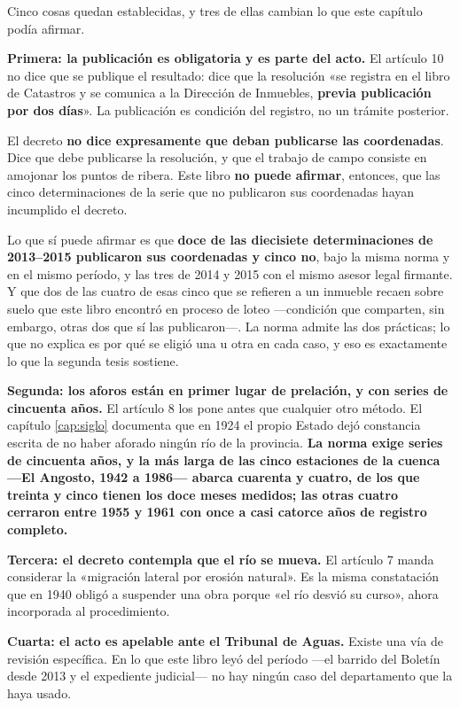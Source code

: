 Cinco cosas quedan establecidas, y tres de ellas cambian lo que este capítulo podía afirmar.

\textbf{Primera: la publicación es obligatoria y es parte del acto.} El artículo 10 no dice
que se publique el resultado: dice que la resolución «se registra en el libro de Catastros y
se comunica a la Dirección de Inmuebles, \textbf{previa publicación por dos días}». La
publicación es condición del registro, no un trámite posterior.

\begin{cautela}
El decreto \textbf{no dice expresamente que deban publicarse las coordenadas}. Dice que debe
publicarse la resolución, y que el trabajo de campo consiste en amojonar los puntos de
ribera. Este libro \textbf{no puede afirmar}, entonces, que las cinco determinaciones de la serie que
no publicaron sus coordenadas hayan incumplido el decreto.

Lo que sí puede afirmar es que \textbf{doce de las diecisiete determinaciones de
2013--2015 publicaron sus coordenadas y cinco no}, bajo la misma norma y en el mismo período, y las tres de 2014 y 2015 con el mismo asesor legal firmante. Y que dos de las cuatro de esas cinco que se refieren a un inmueble recaen sobre suelo que este libro
encontró en proceso de loteo ---condición que comparten, sin embargo, otras dos que sí las publicaron---. La norma admite las dos prácticas; lo que no explica es por qué
se eligió una u otra en cada caso, y eso es exactamente lo que la segunda tesis sostiene.
\end{cautela}

\textbf{Segunda: los aforos están en primer lugar de prelación, y con series de cincuenta
años.} El artículo 8 los pone antes que cualquier otro método. El capítulo \ref{cap:siglo} documenta que en 1924 el propio Estado dejó constancia escrita de no haber aforado ningún río de la provincia.
\textbf{La norma exige series de cincuenta años, y la más larga de las cinco estaciones de la cuenca ---El Angosto, 1942 a 1986--- abarca cuarenta y cuatro, de los que treinta y cinco tienen los doce meses medidos; las otras cuatro cerraron entre 1955 y 1961 con once a casi catorce años de registro completo.}

\textbf{Tercera: el decreto contempla que el río se mueva.} El artículo 7 manda considerar la
«migración lateral por erosión natural». Es la misma constatación que en 1940 obligó a
suspender una obra porque «el río desvió su curso», ahora incorporada al procedimiento.

\textbf{Cuarta: el acto es apelable ante el Tribunal de Aguas.} Existe una vía de revisión
específica. En lo que este libro leyó del período ---el barrido del Boletín desde 2013 y el expediente judicial--- no hay ningún caso del departamento que la haya usado.

